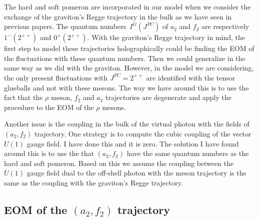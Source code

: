 \documentclass[10 pt]{article}
\begin{document}
The hard and soft pomeron are incorporated in our model when we consider the exchange of the graviton's Regge trajectory in the bulk as we have seen in previous papers. The quantum numbers~$I^G\left(J^{PC}\right)$ of $a_2$ and $f_2$ are respectively $1^{-} \left(2^{++}\right)$ and $0^{+}\left(2^{++}\right)$. With the graviton's Regge trajectory in mind, the first step to model these trajectories holographically could be finding the EOM of the fluctuations with these quantum numbers. Then we could generalize in the same way as we did with the graviton. However, in the model we are considering, the only present fluctuations with $J^{PC} = 2^{++}$ are identified with the tensor glueballs and not with these mesons. The way we have around this is to use the fact that the $\rho$ meson, $f_2$ and $a_2$ trajectories are degenerate and apply the procedure to the EOM of the $\rho$ mesons.

Another issue is the coupling in the bulk of the virtual photon with the fields of  $\left(a_2, f_2\right)$ trajectory. One strategy is to compute the cubic coupling of the vector $U\left(1\right)$ gauge field. I have done this and it is zero. The solution I have found around this is to use the that $\left(a_2, f_2\right)$ have the same quantum numbers as the hard and soft pomeron. Based on this we assume the coupling between the $U\left(1\right)$ gauge field dual to the off-shell photon with the meson trajectory is the same as the coupling with the graviton's Regge trajectory.

\subsection{EOM of the $\left(a_2, f_2\right)$ trajectory}
\end{document}
